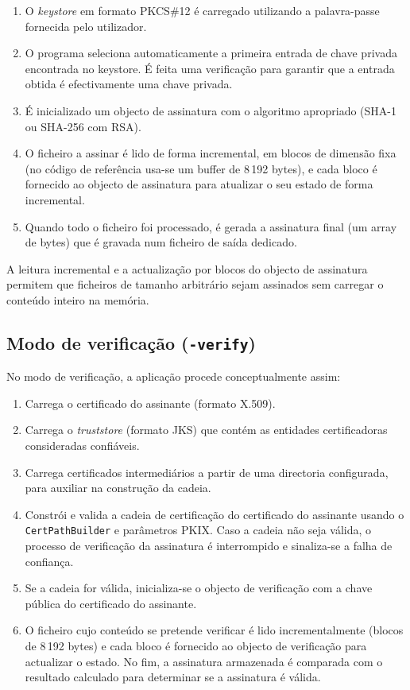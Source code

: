 \begin{enumerate}
    \item O \textit{keystore} em formato PKCS\#12 é carregado utilizando a palavra-passe fornecida pelo utilizador.
    \item O programa seleciona automaticamente a primeira entrada de chave privada encontrada no keystore. É feita uma verificação para garantir que a entrada obtida é efectivamente uma chave privada.
    \item É inicializado um objecto de assinatura com o algoritmo apropriado (SHA-1 ou SHA-256 com RSA).
    \item O ficheiro a assinar é lido de forma incremental, em blocos de dimensão fixa (no código de referência usa-se um buffer de 8\,192 bytes), e cada bloco é fornecido ao objecto de assinatura para atualizar o seu estado de forma incremental.
    \item Quando todo o ficheiro foi processado, é gerada a assinatura final (um array de bytes) que é gravada num ficheiro de saída dedicado.
\end{enumerate}

A leitura incremental e a actualização por blocos do objecto de assinatura permitem que ficheiros de tamanho arbitrário sejam assinados sem carregar o conteúdo inteiro na memória.

\subsection{Modo de verificação (\texttt{-verify})}

No modo de verificação, a aplicação procede conceptualmente assim:

\begin{enumerate}
    \item Carrega o certificado do assinante (formato X.509).
    \item Carrega o \textit{truststore} (formato JKS) que contém as entidades certificadoras consideradas confiáveis.
    \item Carrega certificados intermediários a partir de uma directoria configurada, para auxiliar na construção da cadeia.
    \item Constrói e valida a cadeia de certificação do certificado do assinante usando o \texttt{CertPathBuilder} e parâmetros PKIX. Caso a cadeia não seja válida, o processo de verificação da assinatura é interrompido e sinaliza-se a falha de confiança.
    \item Se a cadeia for válida, inicializa-se o objecto de verificação com a chave pública do certificado do assinante.
    \item O ficheiro cujo conteúdo se pretende verificar é lido incrementalmente (blocos de 8\,192 bytes) e cada bloco é fornecido ao objecto de verificação para actualizar o estado. No fim, a assinatura armazenada é comparada com o resultado calculado para determinar se a assinatura é válida.
\end{enumerate}


